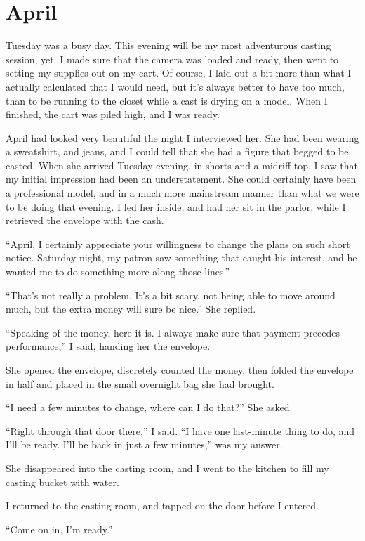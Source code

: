 \chapter{April}
Tuesday was a busy day. This evening will be my most adventurous casting session, yet. I
made sure that the camera was loaded and ready, then went to setting my supplies out on my cart.
Of course, I laid out a bit more than what I actually calculated that I would need, but it's
always better to have too much, than to be running to the closet while a cast is drying on a
model. When I finished, the cart was piled high, and I was ready.

April had looked very beautiful the night I interviewed her. She had been wearing a sweatshirt,
and jeans, and I could tell that she had a figure that begged to be casted. When she arrived
Tuesday evening, in shorts and a midriff top, I saw that my initial impression had been an
understatement. She could certainly have been a professional model, and in a much more
mainstream manner than what we were to be doing that evening. I led her inside, and had her sit
in the parlor, while I retrieved the envelope with the cash.

``April, I certainly appreciate your willingness to change the plans on such short notice.
Saturday night, my patron saw something that caught his interest, and he wanted me to do
something more along those lines.''

``That's not really a problem. It's a bit scary, not being able to move around much, but the
extra money will sure be nice.'' She replied.

``Speaking of the money, here it is. I always make sure that payment precedes performance,'' I
said, handing her the envelope.

She opened the envelope, discretely counted the money, then folded the envelope in half and
placed in the small overnight bag she had brought.

``I need a few minutes to change, where can I do that?'' She asked.

``Right through that door there,'' I said. ``I have one last-minute thing to do, and I'll be
ready. I'll be back in just a few minutes,'' was my answer.

She disappeared into the casting room, and I went to the kitchen to fill my casting bucket with
water.

I returned to the casting room, and tapped on the door before I entered.

``Come on in, I'm ready.''

